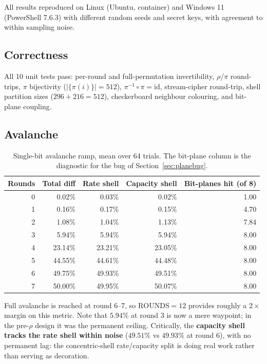 \documentclass[11pt,a4paper]{article}
\theoremstyle{plain}
\theoremstyle{definition}
\theoremstyle{remark}
\begin{document}
All results reproduced on Linux (Ubuntu, container) and Windows 11 (PowerShell 7.6.3)
with different random seeds and secret keys, with agreement to within sampling noise.

\subsection{Correctness}

All 10 unit tests pass: per-round and full-permutation invertibility, $\rho$/$\pi$
round-trips, $\pi$ bijectivity ($|\{\pi(i)\}| = 512$), $\pi^{-1}\circ\pi = \mathrm{id}$,
stream-cipher round-trip, shell partition sizes ($296 + 216 = 512$), checkerboard
neighbour colouring, and bit-plane coupling.

\subsection{Avalanche}

\begin{table}[h]
\centering
\caption{Single-bit avalanche ramp, mean over 64 trials. The bit-plane column is the
diagnostic for the bug of Section~\ref{sec:planebug}.}
\begin{tabular}{rrrrr}
\toprule
Rounds & Total diff & Rate shell & Capacity shell & Bit-planes hit (of 8) \\
\midrule
0 &  0.02\% &  0.03\% &  0.02\% & 1.00 \\
1 &  0.16\% &  0.17\% &  0.15\% & 4.70 \\
2 &  1.08\% &  1.04\% &  1.13\% & 7.84 \\
3 &  5.94\% &  5.94\% &  5.94\% & 8.00 \\
4 & 23.14\% & 23.21\% & 23.05\% & 8.00 \\
5 & 44.55\% & 44.61\% & 44.48\% & 8.00 \\
6 & 49.75\% & 49.93\% & 49.51\% & 8.00 \\
7 & 50.00\% & 49.95\% & 50.07\% & 8.00 \\
\bottomrule
\end{tabular}
\end{table}

Full avalanche is reached at round 6--7, so $\mathrm{ROUNDS} = 12$ provides roughly a
$2\times$ margin on this metric. Note that $5.94\%$ at round 3 is now a mere waypoint;
in the pre-$\rho$ design it was the permanent ceiling. Critically, the
\textbf{capacity shell tracks the rate shell within noise} ($49.51\%$ vs $49.93\%$ at
round 6), with no permanent lag: the concentric-shell rate/capacity split is doing
real work rather than serving as decoration.
\end{document}
